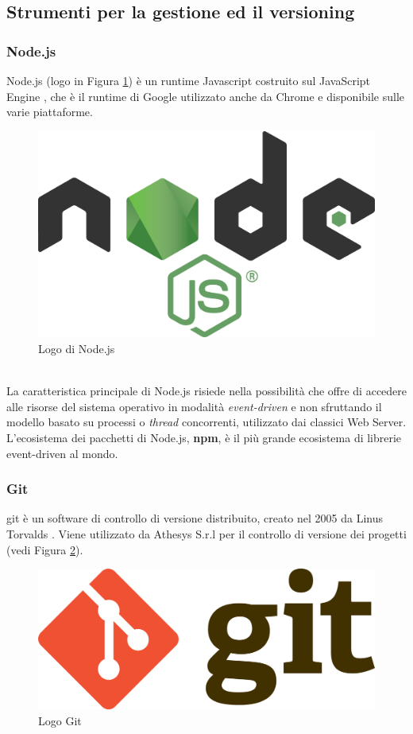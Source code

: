 \subsection{Strumenti per la gestione ed il versioning}
\subsubsection{Node.js}
Node.js (logo in Figura \ref{img:nodejs}) è un runtime Javascript costruito sul JavaScript Engine \cite{nodeGuida}, che è il runtime di Google utilizzato anche da Chrome e disponibile sulle varie piattaforme.
\begin{figure}[h]
	\centering
	\includegraphics[scale=0.05]{immagini/nodejs}
	\caption{Logo di Node.js}
	\label{img:nodejs}
\end{figure}
\\
La caratteristica principale di Node.js risiede nella possibilità che offre di accedere alle risorse del sistema operativo in modalità \emph{\gls{event-driven}}\glsfirstoccur\cite{nodeEvent} e non sfruttando il modello basato su processi o \textit{thread} concorrenti, utilizzato dai classici Web Server. L'ecosistema dei pacchetti di Node.js, \textbf{npm}, è il più grande ecosistema di librerie \gls{event-driven} al mondo.
\subsubsection{Git}
\gls{git} è un software di controllo di versione distribuito, creato nel 2005 da Linus Torvalds \cite{gitSite}. Viene utilizzato da Athesys S.r.l per il controllo di versione dei progetti (vedi Figura \ref{img:git}).
\begin{figure}[h]
	\centering
	\includegraphics[scale=0.05]{immagini/git}
	\caption{Logo Git}
	\label{img:git}
\end{figure}

